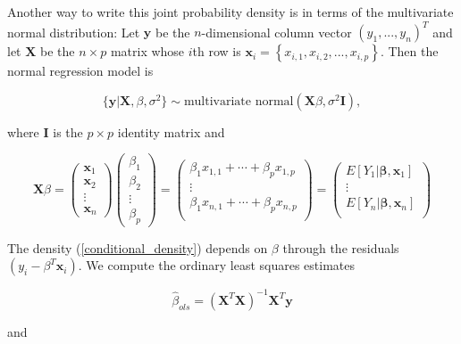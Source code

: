 \documentclass[12pt, a4paper]{article}
\begin{document}
Another way to write this joint probability density is in terms of the multivariate normal distribution:  Let $\mathbf{y}$ be the $n$-dimensional column vector $\left(y_1,...,y_n\right)^T$ and let $\mathbf{X}$ be the $n \times p$ matrix whose $i$th row is $\mathbf{x}_i = \left\{ x_{i,1}, x_{i,2}, ..., x_{i,p} \right\}$.  Then the normal regression model is

$$\{\mathbf{y}|\mathbf{X},\beta,\sigma^2\} \sim \text{multivariate normal}\left(\mathbf{X}\beta,\sigma^2\mathbf{I}\right),$$

where $\mathbf{I}$ is the $p \times p$ identity matrix and

\begin{equation*}
    \mathbf{X}\beta =
    \begin{pmatrix}
        \mathbf{x}_1 \\
        \mathbf{x}_2 \\
        \vdots  \\
        \mathbf{x}_n
    \end{pmatrix}
    \begin{pmatrix}
        \beta_1 \\
        \beta_2 \\
        \vdots \\
        \beta_p
    \end{pmatrix}
    =
    \begin{pmatrix}
        \beta_1 x_{1,1} + \cdots + \beta_p x_{1,p} \\
        \vdots \\
        \beta_1 x_{n,1} + \cdots + \beta_p x_{n,p} \\
    \end{pmatrix}
    =
    \begin{pmatrix}
        E\left[Y_1|\mathbf{\beta},\mathbf{x}_1\right] \\
        \vdots \\
        E\left[Y_n|\mathbf{\beta},\mathbf{x}_n\right] \\
    \end{pmatrix}
\end{equation*}

The density (\ref{conditional_density}) depends on $\beta$ through the residuals $\left(y_i - \beta^T\mathbf{x}_i\right)$.  We compute the ordinary least squares estimates

$$\hat{\beta}_{ols} = \left(\mathbf{X}^T\mathbf{X}\right)^{-1}\mathbf{X}^T\mathbf{y}$$

and
\end{document}
